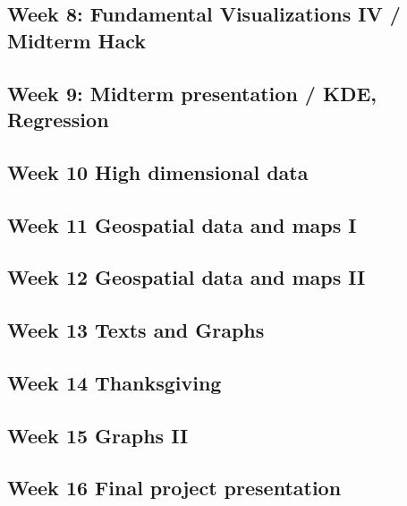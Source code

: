 \documentclass[11pt,article,oneside]{memoir}
\begin{document}
\subsection{Week 8: Fundamental Visualizations IV / Midterm Hack}
\subsection{Week 9: Midterm presentation / KDE, Regression}
\subsection{Week 10 High dimensional data}
\subsection{Week 11 Geospatial data and maps I}
\subsection{Week 12 Geospatial data and maps II}
\subsection{Week 13 Texts and Graphs}
\subsection{Week 14 Thanksgiving}
\subsection{Week 15 Graphs II }
\subsection{Week 16 Final project presentation}
\end{document}
